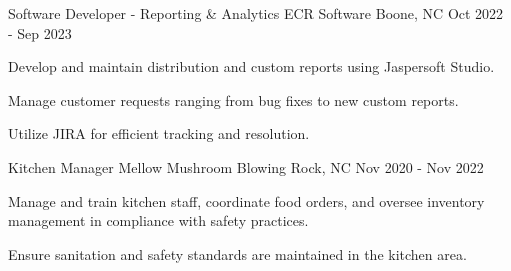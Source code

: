 \begin{cventries}
  \cventry
    {Software Developer - Reporting \& Analytics} %
    {ECR Software} %
    {Boone, NC} %
    {Oct 2022 - Sep 2023} %
    {
      \begin{cvitems} %
        \item {Develop and maintain distribution and custom reports using Jaspersoft Studio.}
        \item {Manage customer requests ranging from bug fixes to new custom reports.}
        \item {Utilize JIRA for efficient tracking and resolution.}
      \end{cvitems}
    }


\cventry
{Kitchen Manager} %
{Mellow Mushroom} %
{Blowing Rock, NC} %
{Nov 2020 - Nov 2022} %
{
  \begin{cvitems} %
    \item {Manage and train kitchen staff, coordinate food orders, and oversee inventory management in compliance with safety practices.}
    \item {Ensure sanitation and safety standards are maintained in the kitchen area.}
  \end{cvitems}
}


\end{cventries}
